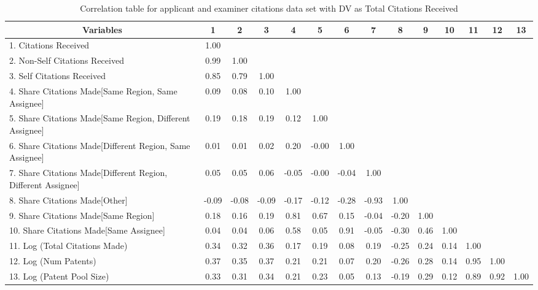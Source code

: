\begin{table}[htbp]\centering \caption{Correlation table for applicant and examiner citations data set with DV as Total Citations Received\label{ae.tcorrelation}}
\scriptsize
\singlespacing
\begin{tabular}{l  c  c  c  c  c  c  c  c  c  c  c  c  c }\hline\hline
\multicolumn{1}{c}{Variables} &1&2&3&4&5&6&7&8&9&10&11&12&13\\ \hline
1. Citations Received&1.00\\
2. Non-Self Citations Received&0.99&1.00\\
3. Self Citations Received&0.85&0.79&1.00\\
4. Share Citations Made[Same Region, Same Assignee]&0.09&0.08&0.10&1.00\\
5. Share Citations Made[Same Region, Different Assignee]&0.19&0.18&0.19&0.12&1.00\\
6. Share Citations Made[Different Region, Same Assignee]&0.01&0.01&0.02&0.20&-0.00&1.00\\
7. Share Citations Made[Different Region, Different Assignee]&0.05&0.05&0.06&-0.05&-0.00&-0.04&1.00\\
8. Share Citations Made[Other]&-0.09&-0.08&-0.09&-0.17&-0.12&-0.28&-0.93&1.00\\
9. Share Citations Made[Same Region]&0.18&0.16&0.19&0.81&0.67&0.15&-0.04&-0.20&1.00\\
10. Share Citations Made[Same Assignee]&0.04&0.04&0.06&0.58&0.05&0.91&-0.05&-0.30&0.46&1.00\\
11. Log (Total Citations Made)&0.34&0.32&0.36&0.17&0.19&0.08&0.19&-0.25&0.24&0.14&1.00\\
12. Log (Num Patents)&0.37&0.35&0.37&0.21&0.21&0.07&0.20&-0.26&0.28&0.14&0.95&1.00\\
13. Log (Patent Pool Size)&0.33&0.31&0.34&0.21&0.23&0.05&0.13&-0.19&0.29&0.12&0.89&0.92&1.00\\
\hline \hline 
 \end{tabular}
\end{table}
